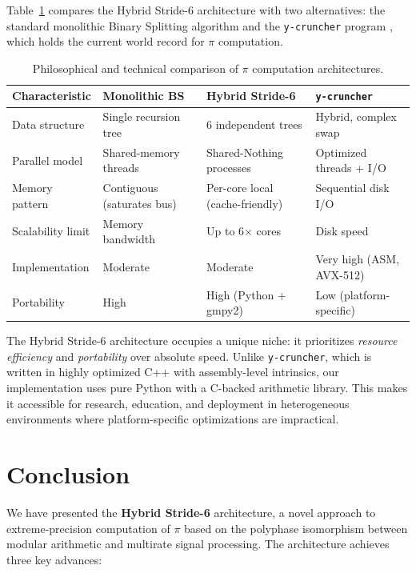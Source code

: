 \documentclass[12pt,a4paper]{article}
\theoremstyle{plain}
\theoremstyle{definition}
\theoremstyle{remark}
\begin{document}
Table~\ref{tab:comparison} compares the Hybrid Stride-6 architecture with two alternatives: the standard monolithic Binary Splitting algorithm and the \texttt{y-cruncher} program \cite{ycruncher}, which holds the current world record for \(\pi\) computation.

\begin{table}[H]
\centering
\caption{Philosophical and technical comparison of \(\pi\) computation architectures.}
\label{tab:comparison}
\begin{tabularx}{\textwidth}{lXXX}
\toprule
\textbf{Characteristic} & \textbf{Monolithic BS} & \textbf{Hybrid Stride-6} & \textbf{\texttt{y-cruncher}} \\
\midrule
Data structure & Single recursion tree & 6 independent trees & Hybrid, complex swap \\
Parallel model & Shared-memory threads & Shared-Nothing processes & Optimized threads + I/O \\
Memory pattern & Contiguous (saturates bus) & Per-core local (cache-friendly) & Sequential disk I/O \\
Scalability limit & Memory bandwidth & Up to 6\(\times\) cores & Disk speed \\
Implementation & Moderate & Moderate & Very high (ASM, AVX-512) \\
Portability & High & High (Python + gmpy2) & Low (platform-specific) \\
\bottomrule
\end{tabularx}
\end{table}

The Hybrid Stride-6 architecture occupies a unique niche: it prioritizes \emph{resource efficiency} and \emph{portability} over absolute speed. Unlike \texttt{y-cruncher}, which is written in highly optimized C++ with assembly-level intrinsics, our implementation uses pure Python with a C-backed arithmetic library. This makes it accessible for research, education, and deployment in heterogeneous environments where platform-specific optimizations are impractical.

\section{Conclusion}
\label{sec:conclusion}

We have presented the \textbf{Hybrid Stride-6} architecture, a novel approach to extreme-precision computation of \(\pi\) based on the polyphase isomorphism between modular arithmetic and multirate signal processing. The architecture achieves three key advances:
\end{document}
